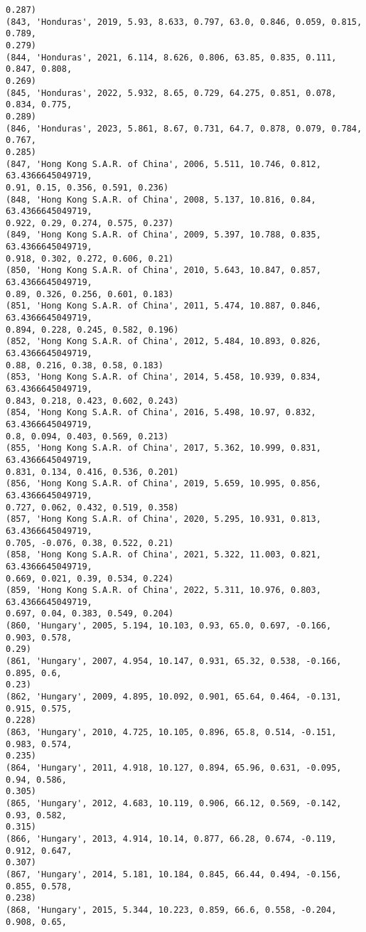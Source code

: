 \documentclass[11pt]{article}
\begin{document}
\begin{Verbatim}[commandchars=\\\{\}]
0.287)
(843, 'Honduras', 2019, 5.93, 8.633, 0.797, 63.0, 0.846, 0.059, 0.815, 0.789,
0.279)
(844, 'Honduras', 2021, 6.114, 8.626, 0.806, 63.85, 0.835, 0.111, 0.847, 0.808,
0.269)
(845, 'Honduras', 2022, 5.932, 8.65, 0.729, 64.275, 0.851, 0.078, 0.834, 0.775,
0.289)
(846, 'Honduras', 2023, 5.861, 8.67, 0.731, 64.7, 0.878, 0.079, 0.784, 0.767,
0.285)
(847, 'Hong Kong S.A.R. of China', 2006, 5.511, 10.746, 0.812, 63.4366645049719,
0.91, 0.15, 0.356, 0.591, 0.236)
(848, 'Hong Kong S.A.R. of China', 2008, 5.137, 10.816, 0.84, 63.4366645049719,
0.922, 0.29, 0.274, 0.575, 0.237)
(849, 'Hong Kong S.A.R. of China', 2009, 5.397, 10.788, 0.835, 63.4366645049719,
0.918, 0.302, 0.272, 0.606, 0.21)
(850, 'Hong Kong S.A.R. of China', 2010, 5.643, 10.847, 0.857, 63.4366645049719,
0.89, 0.326, 0.256, 0.601, 0.183)
(851, 'Hong Kong S.A.R. of China', 2011, 5.474, 10.887, 0.846, 63.4366645049719,
0.894, 0.228, 0.245, 0.582, 0.196)
(852, 'Hong Kong S.A.R. of China', 2012, 5.484, 10.893, 0.826, 63.4366645049719,
0.88, 0.216, 0.38, 0.58, 0.183)
(853, 'Hong Kong S.A.R. of China', 2014, 5.458, 10.939, 0.834, 63.4366645049719,
0.843, 0.218, 0.423, 0.602, 0.243)
(854, 'Hong Kong S.A.R. of China', 2016, 5.498, 10.97, 0.832, 63.4366645049719,
0.8, 0.094, 0.403, 0.569, 0.213)
(855, 'Hong Kong S.A.R. of China', 2017, 5.362, 10.999, 0.831, 63.4366645049719,
0.831, 0.134, 0.416, 0.536, 0.201)
(856, 'Hong Kong S.A.R. of China', 2019, 5.659, 10.995, 0.856, 63.4366645049719,
0.727, 0.062, 0.432, 0.519, 0.358)
(857, 'Hong Kong S.A.R. of China', 2020, 5.295, 10.931, 0.813, 63.4366645049719,
0.705, -0.076, 0.38, 0.522, 0.21)
(858, 'Hong Kong S.A.R. of China', 2021, 5.322, 11.003, 0.821, 63.4366645049719,
0.669, 0.021, 0.39, 0.534, 0.224)
(859, 'Hong Kong S.A.R. of China', 2022, 5.311, 10.976, 0.803, 63.4366645049719,
0.697, 0.04, 0.383, 0.549, 0.204)
(860, 'Hungary', 2005, 5.194, 10.103, 0.93, 65.0, 0.697, -0.166, 0.903, 0.578,
0.29)
(861, 'Hungary', 2007, 4.954, 10.147, 0.931, 65.32, 0.538, -0.166, 0.895, 0.6,
0.23)
(862, 'Hungary', 2009, 4.895, 10.092, 0.901, 65.64, 0.464, -0.131, 0.915, 0.575,
0.228)
(863, 'Hungary', 2010, 4.725, 10.105, 0.896, 65.8, 0.514, -0.151, 0.983, 0.574,
0.235)
(864, 'Hungary', 2011, 4.918, 10.127, 0.894, 65.96, 0.631, -0.095, 0.94, 0.586,
0.305)
(865, 'Hungary', 2012, 4.683, 10.119, 0.906, 66.12, 0.569, -0.142, 0.93, 0.582,
0.315)
(866, 'Hungary', 2013, 4.914, 10.14, 0.877, 66.28, 0.674, -0.119, 0.912, 0.647,
0.307)
(867, 'Hungary', 2014, 5.181, 10.184, 0.845, 66.44, 0.494, -0.156, 0.855, 0.578,
0.238)
(868, 'Hungary', 2015, 5.344, 10.223, 0.859, 66.6, 0.558, -0.204, 0.908, 0.65,

\end{Verbatim}
\end{document}
